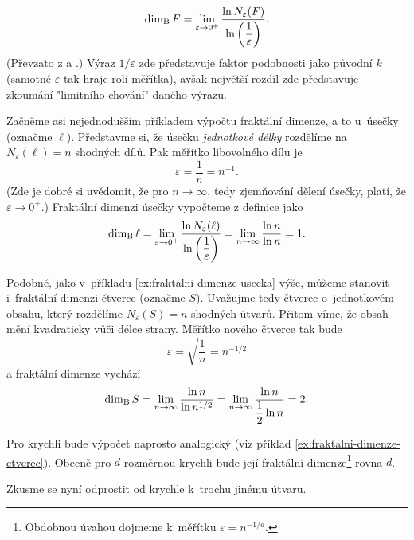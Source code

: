 \begin{equation}\label{eq:fraktalni-dimenze}
    \operatorname{dim_B}{F}=\lim_{\varepsilon\to 0^+}{\dfrac{\ln{N_\varepsilon(F)}}{\ln{\left(\dfrac{1}{\varepsilon}\right)}}}.
\end{equation}
(Převzato z \cite[str. 93]{Zelinka2006} a \cite[str. 28]{Falconer2014}.) Výraz $1/\varepsilon$ zde představuje faktor podobnosti jako původní $k$ (samotné $\varepsilon$ tak hraje roli měřítka), avšak největší rozdíl zde představuje zkoumání "limitního chování" daného výrazu.
\begin{example}\label{ex:fraktalni-dimenze-usecka}
    Začněme asi nejednodušším příkladem výpočtu fraktální dimenze, a to u~úsečky (označme $\ell$). Představme si, že úsečku \emph{jednotkové délky} rozdělíme na $N_\varepsilon(\ell)=n$ shodných dílů. Pak měřítko libovolného dílu je
    \[\varepsilon=\dfrac{1}{n}=n^{-1}.\]
    (Zde je dobré si uvědomit, že pro $n\to\infty$, tedy zjemňování dělení úsečky, platí, že $\varepsilon\to 0^+$.) Fraktální dimenzi úsečky vypočteme z definice jako
    \[\operatorname{dim_B}{\ell}=\lim_{\varepsilon\to 0^+}{\dfrac{\ln{N_\varepsilon(\ell)}}{\ln{\left(\dfrac{1}{\varepsilon}\right)}}}=\lim_{n\to\infty}{\dfrac{\ln{n}}{\ln{n}}}=1.\]
\end{example}
\begin{example}\label{ex:fraktalni-dimenze-ctverec}
    Podobně, jako v~příkladu \ref{ex:fraktalni-dimenze-usecka} výše, můžeme stanovit i~fraktální dimenzi čtverce (označme $S$). Uvažujme tedy čtverec o~jednotkovém obsahu, který rozdělíme $N_\varepsilon(S)=n$ shodných útvarů. Přitom víme, že obsah mění kvadraticky vůči délce strany. Měřítko nového čtverce tak bude
    \[\varepsilon=\sqrt{\dfrac{1}{n}}=n^{-1/2}\]
    a fraktální dimenze vychází
    \[\operatorname{dim_B}{S}=\lim_{n\to\infty}{\dfrac{\ln{n}}{\ln{n^{1/2}}}}=\lim_{n\to\infty}{\dfrac{\ln{n}}{\dfrac{1}{2}\ln{n}}}=2.\]
\end{example}
Pro krychli bude výpočet naprosto analogický (viz příklad \ref{ex:fraktalni-dimenze-ctverec}). Obecně pro $d$-rozměrnou krychli bude její fraktální dimenze\footnote{Obdobnou úvahou dojmeme k~měřítku $\varepsilon=n^{-1/d}$.} rovna $d$.\par
Zkusme se nyní odprostit od krychle k~trochu jinému útvaru.
